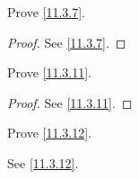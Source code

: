 \begin{ex}\label{ex:11.3.3}
  Prove \cref{11.3.7}.
\end{ex}

\begin{proof}
  See \cref{11.3.7}.
\end{proof}

\begin{ex}\label{ex:11.3.4}
  Prove \cref{11.3.11}.
\end{ex}

\begin{proof}
  See \cref{11.3.11}.
\end{proof}

\begin{ex}\label{ex:11.3.5}
  Prove \cref{11.3.12}.
\end{ex}

\begin{prop}
  See \cref{11.3.12}.
\end{prop}